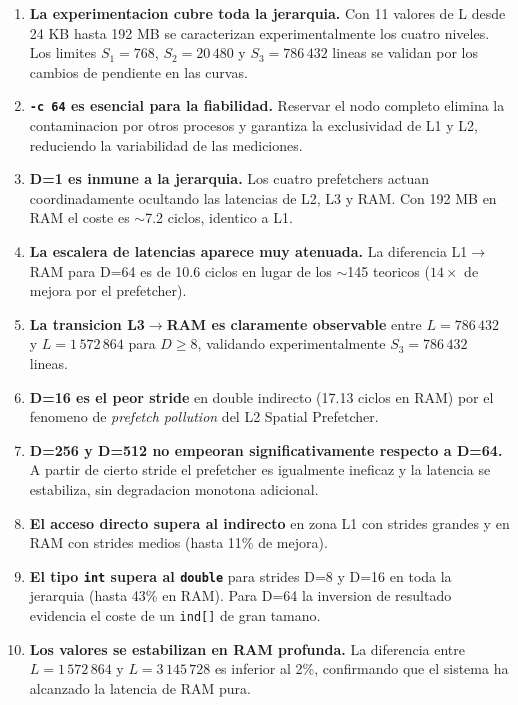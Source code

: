 \documentclass[12pt,a4paper]{article}
\begin{document}
\begin{enumerate}[leftmargin=1.5em]
  \item \textbf{La experimentacion cubre toda la jerarquia.} Con 11 valores de L desde 24 KB hasta 192 MB se caracterizan experimentalmente los cuatro niveles. Los limites $S_1=768$, $S_2=20\,480$ y $S_3=786\,432$ lineas se validan por los cambios de pendiente en las curvas.

  \item \textbf{\texttt{-c 64} es esencial para la fiabilidad.} Reservar el nodo completo elimina la contaminacion por otros procesos y garantiza la exclusividad de L1 y L2, reduciendo la variabilidad de las mediciones.

  \item \textbf{D=1 es inmune a la jerarquia.} Los cuatro prefetchers actuan coordinadamente ocultando las latencias de L2, L3 y RAM. Con 192 MB en RAM el coste es $\sim$7.2 ciclos, identico a L1.

  \item \textbf{La escalera de latencias aparece muy atenuada.} La diferencia L1$\to$RAM para D=64 es de 10.6 ciclos en lugar de los $\sim$145 teoricos ($14\times$ de mejora por el prefetcher).

  \item \textbf{La transicion L3$\to$RAM es claramente observable} entre $L=786\,432$ y $L=1\,572\,864$ para $D \geq 8$, validando experimentalmente $S_3 = 786\,432$ lineas.

  \item \textbf{D=16 es el peor stride} en double indirecto (17.13 ciclos en RAM) por el fenomeno de \emph{prefetch pollution} del L2 Spatial Prefetcher.

  \item \textbf{D=256 y D=512 no empeoran significativamente respecto a D=64.} A partir de cierto stride el prefetcher es igualmente ineficaz y la latencia se estabiliza, sin degradacion monotona adicional.

  \item \textbf{El acceso directo supera al indirecto} en zona L1 con strides grandes y en RAM con strides medios (hasta 11\% de mejora).

  \item \textbf{El tipo \texttt{int} supera al \texttt{double}} para strides D=8 y D=16 en toda la jerarquia (hasta 43\% en RAM). Para D=64 la inversion de resultado evidencia el coste de un \texttt{ind[]} de gran tamano.

  \item \textbf{Los valores se estabilizan en RAM profunda.} La diferencia entre $L=1\,572\,864$ y $L=3\,145\,728$ es inferior al 2\%, confirmando que el sistema ha alcanzado la latencia de RAM pura.
\end{enumerate}
\end{document}
